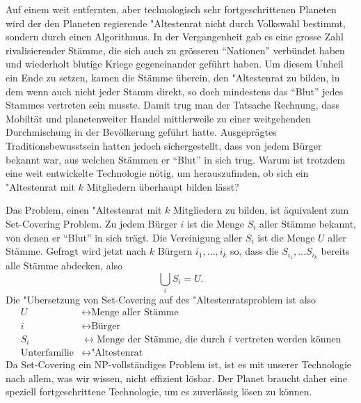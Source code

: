 Auf einem weit entfernten, aber technologisch sehr fortgeschrittenen
Planeten wird der den Planeten regierende "Altestenrat
nicht durch Volkswahl bestimmt, sondern durch einen Algorithmus.
In der Vergangenheit gab es eine grosse Zahl rivalisierender
Stämme, die sich auch zu grösseren ``Nationen'' verbündet haben
und wiederholt blutige Kriege gegeneinander geführt haben.
Um diesem Unheil ein Ende zu setzen, kamen die Stämme überein,
den "Altestenrat zu bilden, in dem wenn auch nicht jeder Stamm direkt,
so doch mindestens das ``Blut'' jedes Stammes vertreten sein musste.
Damit trug man der Tatsache Rechnung, dass Mobiltät und planetenweiter
Handel mittlerweile zu einer weitgehenden Durchmischung in der
Bevölkerung geführt hatte. Ausgeprägtes Traditionsbewusstsein hatten
jedoch sichergestellt, dass von jedem Bürger bekannt war, aus welchen
Stämmen er ``Blut'' in sich trug. Warum ist trotzdem eine weit entwickelte
Technologie nötig, um herauszufinden, ob sich ein "Altestenrat
mit $k$ Mitgliedern überhaupt bilden lässt?

\begin{loesung}
Das Problem, einen "Altestenrat mit $k$  Mitgliedern zu bilden, ist
äquivalent zum Set-Covering Problem. Zu jedem Bürger $i$
ist die Menge $S_i$ aller Stämme bekannt, von denen er ``Blut''
in sich trägt. Die Vereinigung aller $S_i$ ist die Menge $U$ aller
Stämme. Gefragt wird jetzt nach $k$ Bürgern $i_1,\dots,i_k$ so,
dass die $S_{i_1},\dots S_{i_k}$ bereits alle Stämme abdecken, also
\[
\bigcup_i S_i=U.
\]
Die "Ubersetzung von Set-Covering auf des "Altestenratsproblem ist also
\begin{align*}
U&\leftrightarrow\text{Menge aller Stämme}\\
i&\leftrightarrow\text{Bürger}\\
S_i&\leftrightarrow\text{Menge der Stämme, die durch $i$ vertreten werden können}\\
\text{Unterfamilie}&\leftrightarrow\text{"Altestenrat}
\end{align*}
Da Set-Covering ein NP-vollständiges Problem ist, ist es mit unserer
Technologie nach allem, was wir wissen, nicht effizient lösbar. Der
Planet braucht daher eine speziell fortgeschrittene Technologie, um es
zuverlässig lösen zu können.
\end{loesung}
